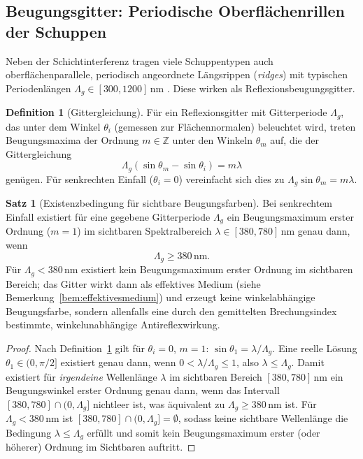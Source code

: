 ﻿\documentclass[a4paper,12pt]{article}
\theoremstyle{definition}
\newtheorem{definition}{Definition}
\newtheorem{satz}{Satz}
\begin{document}
\subsection{Beugungsgitter: Periodische Oberflächenrillen der Schuppen}
\label{sec:beugung}

Neben der Schichtinterferenz tragen viele Schuppentypen auch
oberflächenparallele, periodisch angeordnete Längsrippen
(\textit{ridges}) mit typischen Periodenlängen $\Lambda_g \in
[300,1200]$\,nm \cite{ghiradella1991light}. Diese wirken als
Reflexionsbeugungsgitter.

\begin{definition}[Gittergleichung]
	\label{def:gittergleichung}
	Für ein Reflexionsgitter mit Gitterperiode $\Lambda_g$, das unter dem
	Winkel $\theta_i$ (gemessen zur Flächennormalen) beleuchtet wird, treten
	Beugungsmaxima der Ordnung $m\in\mathbb{Z}$ unter den Winkeln
	$\theta_m$ auf, die der Gittergleichung
	\[
	\Lambda_g\left(\sin\theta_m - \sin\theta_i\right) = m\lambda
	\]
	genügen. Für senkrechten Einfall ($\theta_i = 0$) vereinfacht sich dies
	zu $\Lambda_g \sin\theta_m = m\lambda$.
\end{definition}

\begin{satz}[Existenzbedingung für sichtbare Beugungsfarben]
	\label{satz:beugungsfarben}
	Bei senkrechtem Einfall existiert für eine gegebene Gitterperiode
	$\Lambda_g$ ein Beugungsmaximum erster Ordnung ($m=1$) im sichtbaren
	Spektralbereich $\lambda \in [380,780]$\,nm genau dann, wenn
	\[
	\Lambda_g \ge 380\,\text{nm}.
	\]
	Für $\Lambda_g < 380$\,nm existiert kein Beugungsmaximum erster Ordnung
	im sichtbaren Bereich; das Gitter wirkt dann als effektives Medium
	(siehe Bemerkung~\ref{bem:effektivesmedium}) und erzeugt keine
	winkelabhängige Beugungsfarbe, sondern allenfalls eine durch den
	gemittelten Brechungsindex bestimmte, winkelunabhängige Antireflexwirkung.
\end{satz}

\begin{proof}
	Nach Definition~\ref{def:gittergleichung} gilt für $\theta_i=0$,
	$m=1$: $\sin\theta_1 = \lambda/\Lambda_g$. Eine reelle Lösung
	$\theta_1\in(0,\pi/2]$ existiert genau dann, wenn
	$0 < \lambda/\Lambda_g \le 1$, also $\lambda \le \Lambda_g$. Damit
	existiert für \emph{irgendeine} Wellenlänge $\lambda$ im sichtbaren
	Bereich $[380,780]$\,nm ein Beugungswinkel erster Ordnung genau dann,
	wenn das Intervall $[380,780]\cap(0,\Lambda_g]$ nichtleer ist, was
	äquivalent zu $\Lambda_g \ge 380$\,nm ist. Für $\Lambda_g<380$\,nm ist
	$[380,780]\cap(0,\Lambda_g] = \emptyset$, sodass keine sichtbare
	Wellenlänge die Bedingung $\lambda\le\Lambda_g$ erfüllt und somit kein
	Beugungsmaximum erster (oder höherer) Ordnung im Sichtbaren auftritt.
\end{proof}
\end{document}
